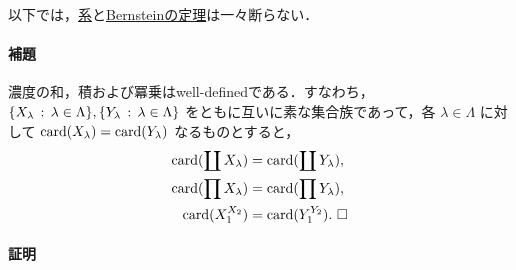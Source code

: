 \documentclass[pandoc,base=10pt,b5j,precisetext]{bxjsarticle}
\let\oldparagraph\paragraph
\renewcommand{\paragraph}[1]{\oldparagraph{#1}\mbox{}}
\begin{document}
以下では，\protect\hyperlink{equivalence-of-existence-of-injection-and-surjection}{系}と\protect\hyperlink{bernstein-theorem}{Bernsteinの定理}は一々断らない．

\hypertarget{ux88dcux984c}{%
\paragraph{補題}\label{ux88dcux984c}}

濃度の和，積および冪乗はwell-definedである．すなわち，\(\{ X_\lambda \,:\, \lambda \in \Lambda \}, \{ Y_\lambda \,:\, \lambda \in \Lambda \}\)
をともに互いに素な集合族であって，各 \(\lambda \in \Lambda\) に対して
\(\mathop{\mathrm{card}}\nolimits(X_\lambda) = \mathop{\mathrm{card}}\nolimits(Y_\lambda)\) なるものとすると，
\begin{align*}
\mathop{\mathrm{card}}\nolimits(\coprod X_\lambda) &= \mathop{\mathrm{card}}\nolimits(\coprod Y_\lambda),\\
\mathop{\mathrm{card}}\nolimits(\prod X_\lambda) &= \mathop{\mathrm{card}}\nolimits(\prod Y_\lambda),\\
\mathop{\mathrm{card}}\nolimits(X_1^{X_2}) &= \mathop{\mathrm{card}}\nolimits(Y_1^{Y_2}).\ \Box
\end{align*}

\hypertarget{ux8a3cux660e}{%
\paragraph{証明}\label{ux8a3cux660e}}
\end{document}
